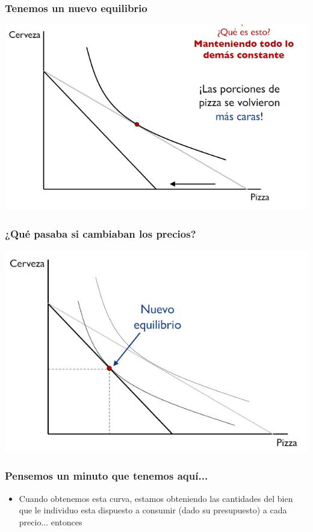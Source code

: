\documentclass{beamer}
\begin{document}
\begin{frame}
\frametitle{ Tenemos un nuevo equilibrio}
\centering
\includegraphics[scale=0.6]{Figures/Tema_02.20_rp18.jpg}
\end{frame}

\begin{frame}
\frametitle{ ¿Qué pasaba si cambiaban los precios?}
\centering
\includegraphics[scale=0.6]{Figures/Tema_02.22_rp20.jpg}
\end{frame}

\begin{frame}
\frametitle{ Pensemos un minuto que tenemos aquí...}
\begin{itemize}
    \item Cuando obtenemos esta curva, estamos obteniendo las cantidades del bien que le individuo esta dispuesto a consumir (dado su presupuesto) a cada precio... entonces
\end{itemize}
\end{frame}
\end{document}
